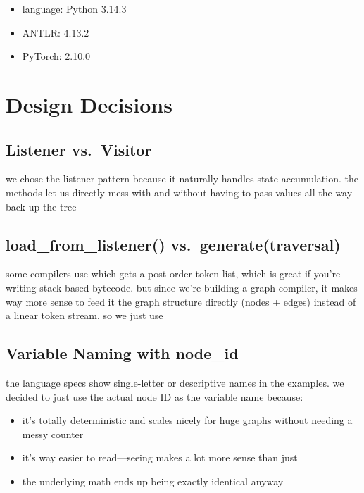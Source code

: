 \documentclass{nngraph-en}
\begin{document}
\begin{itemize}[noitemsep]
    \item language: Python 3.14.3
    \item ANTLR: 4.13.2
    \item PyTorch: 2.10.0
\end{itemize}

\chapter{Design Decisions}

\section{Listener vs.\ Visitor}

we chose the listener pattern because it naturally handles state accumulation. the  methods let us directly mess with  and  without having to pass values all the way back up the tree

\section{load\_from\_listener() vs.\ generate(traversal)}

some compilers use  which gets a post-order token list, which is great if you're writing stack-based bytecode. but since we're building a graph compiler, it makes way more sense to feed it the graph structure directly (nodes + edges) instead of a linear token stream. so we just use 

\section{Variable Naming with node\_id}

the language specs show single-letter or descriptive names in the examples. we decided to just use the actual node ID as the variable name because:
\begin{itemize}[noitemsep]
    \item it's totally deterministic and scales nicely for huge graphs without needing a messy counter
    \item it's way easier to read---seeing  makes a lot more sense than just 
    \item the underlying math ends up being exactly identical anyway
\end{itemize}
\end{document}
